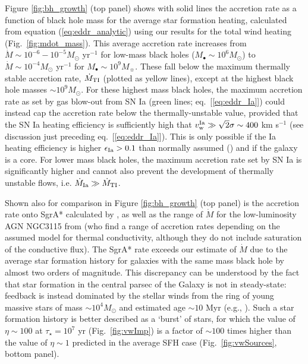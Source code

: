 \documentclass[usenatbib,fleqn]{mn2e}
\begin{document}
Figure \ref{fig:bh_growth} (top panel) shows with solid lines the
accretion rate as a function of black hole mass for the average star
formation heating, calculated from equation (\ref{eq:eddr_analytic})
using our results for the total wind heating
(Fig.~\ref{fig:mdot_mass}).  This average accretion rate increases
from $\dot{M} \sim 10^{-6}-10^{-5}M_{\odot}$ yr$^{-1}$ for low-mass
black holes ($M_{\bullet} \sim 10^{6}M_{\odot}$) to $\dot{M} \sim
10^{-4}M_{\odot}$ yr$^{-1}$ for $M_{\bullet} \sim 10^{9}M_{\sun}$.
These fall below the maximum thermally stable accretion rate,
$\dot{M}_{\rm TI}$ (plotted as yellow lines), except at the highest
black hole masses $\sim 10^{9}M_{\odot}$.  For these highest mass
black holes, the maximum accretion rate as set by gas blow-out from SN
Ia (green lines; eq.~[\ref{eq:eddr_Ia}]) could instead cap the
accretion rate below the thermally-unstable value, provided that the
SN Ia heating efficiency is sufficiently high that $v_{\rm w}^{\rm Ia}
\gg \sqrt{2}\sigma \sim 400$ km s$^{-1}$ (see discussion just
preceding eq.~[\ref{eq:eddr_Ia}]).  This is only possible if the Ia
heating efficiency is higher $\epsilon_{\rm Ia} > 0.1$ than normally
assumed (\citealt{Sharma+14}) and if the galaxy is a core.  For lower mass black holes, the
maximum accretion rate set by SN Ia is significantly higher and cannot
also prevent the development of thermally unstable flows,
i.e. $\dot{M}_{\rm Ia} \gg \dot{M}_{\rm TI}$.

Shown also for comparison in Figure \ref{fig:bh_growth} (top panel) is the accretion rate onto SgrA* calculated by \citet{Quataert:2004a}, as well as the range of $\dot{M}$ for the low-luminosity AGN NGC3115 from \citealt{ShcherbakovWong+:2014a} (who find a range of accretion rates depending on the assumed model for thermal conductivity, although they do not include saturation of the conductive flux).  The SgrA* rate exceeds our estimate of $\dot{M}$ due to the average star formation history for galaxies with the same mass black hole by almost two orders of magnitude.  This discrepancy can be understood by the fact that star formation in the central parsec of the Galaxy is not in steady-state: feedback is instead dominated by the stellar winds from the ring of young massive stars of mass $\sim 10^{4}M_{\odot}$ and estimated age $\sim 10$ Myr (e.g., \citealt{Schodel+07}).  Such a star formation history is better described as a `burst' of stars, for which the value of $\eta \sim 100$ at $\tau_{\star} = 10^{7}$ yr (Fig.~\ref{fig:vwImp}) is a factor of $\sim 100$ times higher than the value of $\eta \sim 1$ predicted in the average SFH case (Fig.~\ref{fig:vwSources}, bottom panel).
\end{document}
